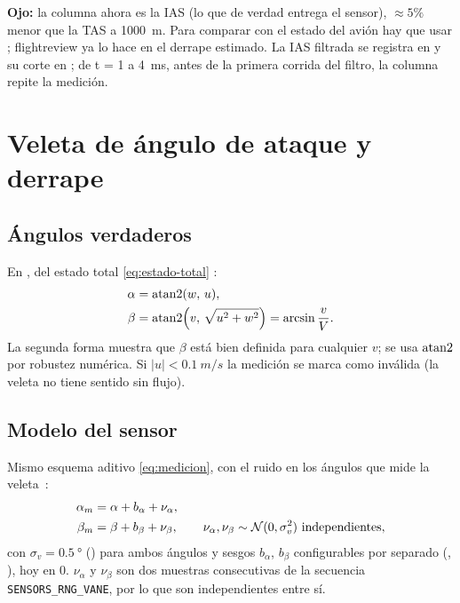 \documentclass[11pt,a4paper]{article}
\begin{document}
\textbf{Ojo:} la columna  ahora es la IAS (lo que de verdad
entrega el sensor), $\approx 5\%$ menor que la TAS a \SI{1000}{m}. Para
comparar con el estado del avión hay que usar ; flightreview
ya lo hace en el derrape estimado. La IAS filtrada se registra en
 y su corte en ; de t = 1 a
\SI{4}{ms}, antes de la primera corrida del filtro, la columna repite la medición.

\section{Veleta de ángulo de ataque y derrape}
\label{sec:veleta}

\subsection{Ángulos verdaderos}

En , del estado total \eqref{eq:estado-total}
\cite{morelli}:
\begin{align}
  \alpha &= \operatorname{atan2}(w,\,u), \\
  \beta  &= \operatorname{atan2}\!\left(v,\,\sqrt{u^2+w^2}\right) = \arcsin\frac{v}{V}.
\end{align}
La segunda forma muestra que $\beta$ está bien definida para cualquier $v$; se
usa $\operatorname{atan2}$ por robustez numérica. Si $|u| < \SI{0.1}{m/s}$ la medición se
marca como inválida (la veleta no tiene sentido sin flujo).

\subsection{Modelo del sensor}

Mismo esquema aditivo \eqref{eq:medicion}, con el ruido en los ángulos que
mide la veleta~\cite{beard}:
\begin{align}
  \alpha_m &= \alpha + b_\alpha + \nu_\alpha, \\
  \beta_m  &= \beta  + b_\beta  + \nu_\beta,
  \qquad \nu_\alpha, \nu_\beta \sim \Normal(0, \sigma_v^2)\ \text{independientes},
\end{align}
con $\sigma_v = \SI{0.5}{\degree}$ () para ambos
ángulos y sesgos $b_\alpha$, $b_\beta$ configurables por separado
(, ), hoy en 0.
$\nu_\alpha$ y $\nu_\beta$ son dos muestras consecutivas de la secuencia
\texttt{SENSORS\_RNG\_VANE}, por lo que son independientes entre sí.
\end{document}
